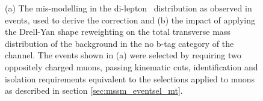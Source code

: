 \begin{figure}[h!]
\begin{center}
\end{center}
\caption[The mis-modelling in the di-lepton \pT~distribution as observed
in \mbox{\Zmm} events, and the impact of applying the Drell-Yan shape reweighting
on the total transverse mass distribution of the \Ztautau background in the no b-tag category of the \etau channel.]{(a) The mis-modelling in the di-lepton \pT~distribution as observed
in \Zmm events, used to derive the correction and (b) the impact of applying the Drell-Yan shape
reweighting on the total transverse
mass distribution of the \Ztautau background in the no b-tag category of the \etau channel. The events shown in (a) were selected 
by requiring two oppositely charged muons, passing kinematic cuts, identification and isolation requirements equivalent to the selections
applied to muons as described in section \ref{sec:mssm_eventsel_mt}.}
\label{fig:dyrwt}
\end{figure}


